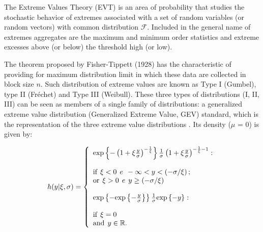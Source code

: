 \documentclass{asaproc}
\begin{document}
The Extreme Values Theory (EVT) is an area of probability that studies the stochastic behavior of extremes associated with a set of random variables (or random vectors) with common distribution $\mathcal{F}$. Included in the general name of extremes aggregates are the maximum and minimum order statistics and extreme excesses above (or below) the threshold high (or low).

The theorem proposed by Fisher-Tippett (1928) has the characteristic of providing for maximum distribution limit in which these data are collected in block size $n$. Such distribution of extreme values are known as Type I (Gumbel), type II (Fréchet) and Type III (Weibull). These three types of distributions (I, II, III) can be seen as members of a single family of distributions: a generalized extreme value distribution (Generalized Extreme Value, GEV) standard, which is the representation of the three extreme value distributions . Its density ($\mu$ = 0) is given by:

\begin{eqnarray*}
\begin{array}{ccl}
h(y|\xi, \sigma) = \left\{ 
\begin{array}{lcl}
\mbox{exp} \left\{ -\left(1+\xi \frac{y}{\sigma}\right)^{-\frac{1}{\xi}} \right\}\frac{1}{\sigma} \left(1+\xi \frac{y}{\sigma}\right)^{-\frac{1}{\xi} - 1}:  \\\\
\mbox{if} \hspace{1ex} \xi < 0 \hspace{1ex} e \hspace{1ex} -\infty < y < \left(-\sigma/\xi\right);\\

\mbox{or} \hspace{1ex}\xi > 0 \hspace{1ex} e \hspace{1ex} y \geq \left(-\sigma/\xi\right)\\\\

\mbox{exp} \left\{ -\mbox{exp} \left\{ -\frac{y}{\sigma} \right\} \right\} \frac{1}{\sigma} \mbox{exp} \left\{ -y \right\}: \\\\

\mbox{if} \hspace{1ex}\xi = 0 \hspace{1ex} \\
\mbox{and} \hspace{1ex} y \in \mathbb{R}.
\end{array}
\right.
\end{array}
\end{eqnarray*}
\end{document}
